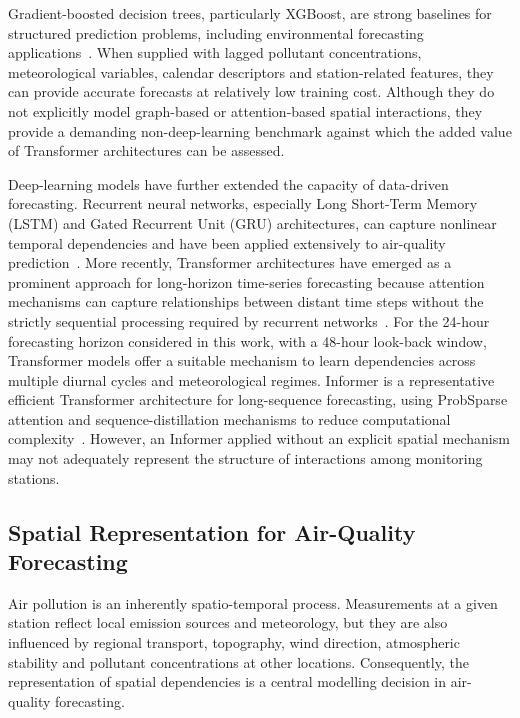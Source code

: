 \documentclass[11pt]{article}
\begin{document}
Gradient-boosted decision trees, particularly XGBoost, are strong baselines for structured prediction problems, including environmental forecasting applications~\cite{Chen2016XGBoost,Wallek2024,Wang2023XGBoost}. When supplied with lagged pollutant concentrations, meteorological variables, calendar descriptors and station-related features, they can provide accurate forecasts at relatively low training cost. Although they do not explicitly model graph-based or attention-based spatial interactions, they provide a demanding non-deep-learning benchmark against which the added value of Transformer architectures can be assessed.

Deep-learning models have further extended the capacity of data-driven forecasting. Recurrent neural networks, especially Long Short-Term Memory (LSTM) and Gated Recurrent Unit (GRU) architectures, can capture nonlinear temporal dependencies and have been applied extensively to air-quality prediction~\cite{Hochreiter1997,Zhao2023,Qin2019}. More recently, Transformer architectures have emerged as a prominent approach for long-horizon time-series forecasting because attention mechanisms can capture relationships between distant time steps without the strictly sequential processing required by recurrent networks~\cite{Vaswani2017,wen2023transformerstimeseriessurvey}. For the 24-hour forecasting horizon considered in this work, with a 48-hour look-back window, Transformer models offer a suitable mechanism to learn dependencies across multiple diurnal cycles and meteorological regimes. Informer is a representative efficient Transformer architecture for long-sequence forecasting, using ProbSparse attention and sequence-distillation mechanisms to reduce computational complexity~\cite{Zhou2021Informer}. However, an Informer applied without an explicit spatial mechanism may not adequately represent the structure of interactions among monitoring stations.

\subsection{Spatial Representation for Air-Quality Forecasting}

Air pollution is an inherently spatio-temporal process. Measurements at a given station reflect local emission sources and meteorology, but they are also influenced by regional transport, topography, wind direction, atmospheric stability and pollutant concentrations at other locations. Consequently, the representation of spatial dependencies is a central modelling decision in air-quality forecasting.
\end{document}
